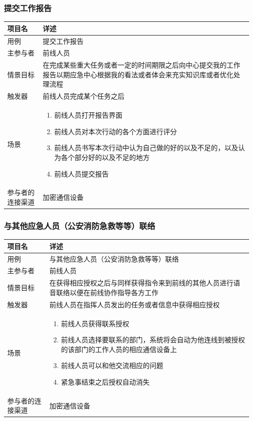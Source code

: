 \documentclass{ctexrep}
\begin{document}
\subsubsection{提交工作报告}
\begin{longtable}{p{2cm} | p{10cm}}
\hline
项目名 & 详述 \\
\hline
\hline
用例 &  提交工作报告\\
\hline
主参与者 & 前线人员 \\
\hline
情景目标 &  在完成某些重大任务或者一定的时间期限之后向中心提交我的工作报告以期应急中心根据我的看法或者体会来充实知识库或者优化处理流程\\
\hline
触发器 & 前线人员完成某个任务之后\\
\hline
场景 & \begin{enumerate}
	\item 前线人员打开报告界面
	\item 前线人员对本次行动的各个方面进行评分
	\item 前线人员书写本次行动中认为自己做的好的以及不足的，以及认为各个部分好的以及不足的地方
	\item 前线人员提交报告
\end{enumerate} \\
\hline
参与者的连接渠道 & 加密通信设备\\
\hline
\end{longtable}

\subsubsection{与其他应急人员（公安消防急救等等）联络}
\begin{longtable}{p{2cm} | p{10cm}}
\hline
项目名 & 详述 \\
\hline
\hline
用例 & 与其他应急人员（公安消防急救等等）联络\\
\hline
主参与者 & 前线人员 \\
\hline
情景目标 &  在获得相应授权之后与同样获得指令来到前线的其他人员进行语音联络以便在前线协作指导各方工作\\
\hline
触发器 & 前线人员在指挥人员发出的任务或者信息中获得相应授权 \\
\hline
场景 & \begin{enumerate}
	\item 前线人员获得联系授权
	\item 前线人员选择要联系的部门，系统将会自动为他连线到被授权的该部门的工作人员的相应通信设备上
	\item 前线人员可以和他交流相应的问题
	\item 紧急事结束之后授权自动消失
\end{enumerate} \\
\hline
参与者的连接渠道 & 加密通信设备\\
\hline
\end{longtable}
\end{document}
